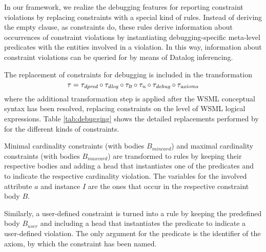 
In our framework, we realize the debugging features for reporting
constraint violations by replacing constraints with a special kind
of rules. Instead of deriving the empty clause, as constraints do,
these rules derive information about occurrences of constraint
violations by instantiating debugging-specific meta-level
predicates with the entities involved in a violation. In this way,
information about constraint violations can be queried for by
means of Datalog inferencing.

The replacement of constraints for debugging is included in the
transformation \compress
\begin{displaymath}
    \tau = \transdpred \circ \transdlog \circ \translt \circ \transnorm \circ \transdebug \circ
    \transax \compress
\end{displaymath}
where the additional transformation step \transdebug is applied
after the WSML conceptual syntax has been resolved, replacing
constraints on the level of WSML logical expressions. Table
\ref{tab:debugging} shows the detailed replacements performed by
\transdebug for the different kinds of constraints.

Minimal cardinality constraints (with bodies $B_{mincard}$) and
maximal cardinality constraints (with bodies $B_{maxcard}$) are
transformed to rules by keeping their respective bodies and adding
a head that instantiates one of the predicates \pvmincard and
\pvmaxcard to indicate the respective cardinality violation. The
variables for the involved attribute $a$ and instance $I$ are the
ones that occur in the respective constraint body $B$.

Similarly, a user-defined constraint is turned into a rule by
keeping the predefined body $B_{user}$ and including a head that
instantiates the predicate \pvuser to indicate a user-defined
violation. The only argument for the predicate \pvuser is the
identifier \axiomid of the axiom, by which the constraint has been
named.

